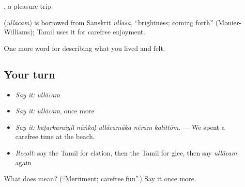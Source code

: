 , a pleasure trip.

\begin{cousinweb}
\textbf{} (\emph{ullācam}) is borrowed from Sanskrit \emph{ullāsa}, \textquotedblleft{}brightness; coming forth\textquotedblright{} (Monier-Williams); Tamil uses it for carefree enjoyment.
\end{cousinweb}

\begin{grammarlens}[title={What you've built}]
One more word for describing what you lived and felt.
\end{grammarlens}

\subsection*{Your turn}
\begin{itemize}
\raggedright
  \item \emph{Say it:} \emph{ullācam}
  \item \emph{Say it:} \emph{ullācam}, once more
  \item \emph{Say it:} \emph{kaṭaṟkaraiyil nāṅkaḷ ullācamāka nēram kaḻittōm.} — We spent a carefree time at the beach.
  \item \emph{Recall:} say the Tamil for elation, then the Tamil for glee, then say \emph{ullācam} again
\end{itemize}

\begin{tcolorbox}[breakable,colback=teal!4,colframe=teal!35!black,title={Before you move on}]
What does  mean? (\textquotedblleft{}Merriment; carefree fun\textquotedblright{}.) Say it once more.
\end{tcolorbox}
